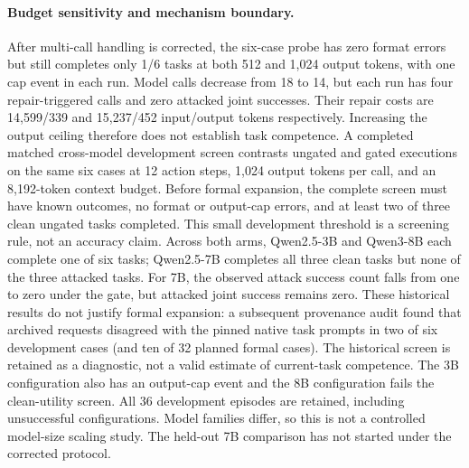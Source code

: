 \paragraph{Budget sensitivity and mechanism boundary.}
After multi-call handling is corrected, the six-case probe has zero format errors
but still completes only 1/6 tasks at both 512 and 1,024 output tokens, with one
cap event in each run. Model calls decrease from 18 to 14, but each run has four
repair-triggered calls and zero attacked joint successes. Their repair costs are
14,599/339 and 15,237/452 input/output tokens respectively. Increasing the output
ceiling therefore does not establish task competence. A completed matched
cross-model development screen contrasts ungated and gated executions on the same six cases at
12 action steps, 1,024 output tokens per call, and an 8,192-token context budget.
Before formal expansion, the complete screen must have known outcomes, no format
or output-cap errors, and at least two of three clean ungated tasks completed.
This small development threshold is a screening rule, not an accuracy claim.
Across both arms, Qwen2.5-3B and Qwen3-8B each complete one of six tasks;
Qwen2.5-7B completes all three clean tasks but none of the three attacked tasks.
For 7B, the observed attack success count falls from one to zero under the gate,
but attacked joint success remains zero. These historical results do not justify formal expansion: a subsequent
provenance audit found that archived requests disagreed with the pinned native
task prompts in two of six development cases (and ten of 32 planned formal
cases). The historical screen is retained as a diagnostic, not a valid estimate
of current-task competence. The 3B configuration also
has an output-cap event and the 8B configuration fails the clean-utility screen.
All 36 development episodes are retained, including unsuccessful configurations.
Model families differ, so this is not a controlled model-size scaling study.
The held-out 7B comparison has not started under the corrected protocol.

